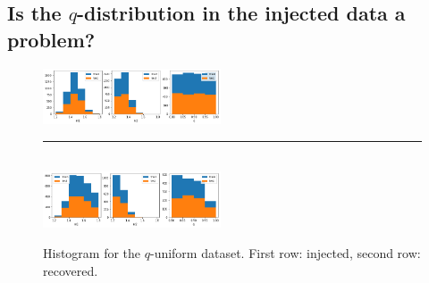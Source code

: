 \documentclass[prd,aps,twocolumn,a4paper,showkeys,nofootinbib]{revtex4-1}
\begin{document}
\subsection{Is the $q$-distribution in the injected data a problem?}
\label{sec:epochs_quniform}
%
\begin{figure}[]
  \center
  \includegraphics[width=0.47\textwidth]{./Figs/quniform_histo_inj.png}
  \rule[1ex]{7cm}{0.5pt}\\
  \includegraphics[width=0.47\textwidth]{./Figs/quniform_histo_rec.png}
  \caption{\label{fig:histo_quniform} Histogram for the $q$-uniform dataset.
  First row: injected, second row: recovered. }
\end{figure}
%
\end{document}
